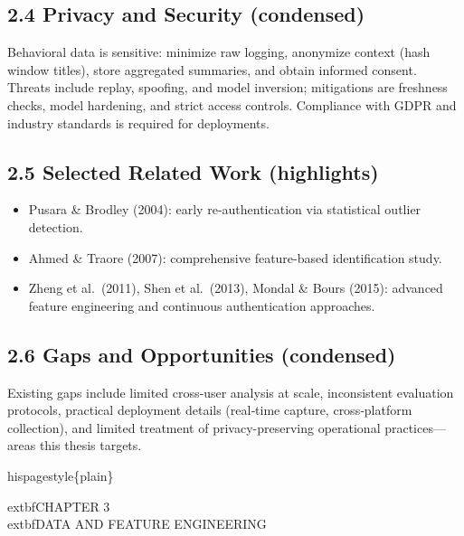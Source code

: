 \documentclass[
  11pt,
  a4paper,
]{article}
\providecommand{\tightlist}{%
  \setlength{\itemsep}{0pt}\setlength{\parskip}{0pt}}
\begin{document}
\subsection{2.4 Privacy and Security
(condensed)}\label{privacy-and-security-condensed}

Behavioral data is sensitive: minimize raw logging, anonymize context
(hash window titles), store aggregated summaries, and obtain informed
consent. Threats include replay, spoofing, and model inversion;
mitigations are freshness checks, model hardening, and strict access
controls. Compliance with GDPR and industry standards is required for
deployments.

\subsection{2.5 Selected Related Work
(highlights)}\label{selected-related-work-highlights}

\begin{itemize}
\tightlist
\item
  Pusara \& Brodley (2004): early re‑authentication via statistical
  outlier detection.
\item
  Ahmed \& Traore (2007): comprehensive feature-based identification
  study.
\item
  Zheng et al.~(2011), Shen et al.~(2013), Mondal \& Bours (2015):
  advanced feature engineering and continuous authentication approaches.
\end{itemize}

\subsection{2.6 Gaps and Opportunities
(condensed)}\label{gaps-and-opportunities-condensed}

Existing gaps include limited cross‑user analysis at scale, inconsistent
evaluation protocols, practical deployment details (real‑time capture,
cross‑platform collection), and limited treatment of privacy-preserving
operational practices---areas this thesis targets.

\newpage

\newpage

hispagestyle\{plain\}

\begin{center}
\vspace*{2cm}
    extbf{\Large CHAPTER 3}\\[0.5cm]
    extbf{\Large DATA AND FEATURE ENGINEERING}
\end{center}
\end{document}
